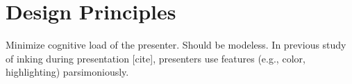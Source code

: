 \section{Design Principles}

Minimize cognitive load of the presenter. Should be modeless.
In previous study of inking during presentation [cite], presenters use features (e.g., color, highlighting) parsimoniously.

